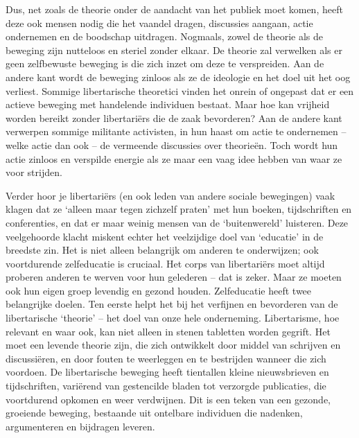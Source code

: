 \documentclass[
  a5paper,
  smalldemyvopaper,10pt,twoside,onecolumn,openright,extrafontsizes,hidelinks]{memoir}
\begin{document}
Dus, net zoals de theorie onder de aandacht van het publiek moet komen,
heeft deze ook mensen nodig die het vaandel dragen, discussies aangaan,
actie ondernemen en de boodschap uitdragen. Nogmaals, zowel de theorie
als de beweging zijn nutteloos en steriel zonder elkaar. De theorie zal
verwelken als er geen zelfbewuste beweging is die zich inzet om deze te
verspreiden. Aan de andere kant wordt de beweging zinloos als ze de
ideologie en het doel uit het oog verliest. Sommige libertarische
theoretici vinden het onrein of ongepast dat er een actieve beweging met
handelende individuen bestaat. Maar hoe kan vrijheid worden bereikt
zonder libertariërs die de zaak bevorderen? Aan de andere kant verwerpen
sommige militante activisten, in hun haast om actie te ondernemen --
welke actie dan ook -- de vermeende discussies over theorieën. Toch
wordt hun actie zinloos en verspilde energie als ze maar een vaag idee
hebben van waar ze voor strijden.

Verder hoor je libertariërs (en ook leden van andere sociale bewegingen)
vaak klagen dat ze `alleen maar tegen zichzelf praten' met hun boeken,
tijdschriften en conferenties, en dat er maar weinig mensen van de
`buitenwereld' luisteren. Deze veelgehoorde klacht miskent echter het
veelzijdige doel van `educatie' in de breedste zin. Het is niet alleen
belangrijk om anderen te onderwijzen; ook voortdurende zelfeducatie is
cruciaal. Het corps van libertariërs moet altijd proberen anderen te
werven voor hun gelederen -- dat is zeker. Maar ze moeten ook hun eigen
groep levendig en gezond houden. Zelfeducatie heeft twee belangrijke
doelen. Ten eerste helpt het bij het verfijnen en bevorderen van de
libertarische `theorie' -- het doel van onze hele onderneming.
Libertarisme, hoe relevant en waar ook, kan niet alleen in stenen
tabletten worden gegrift. Het moet een levende theorie zijn, die zich
ontwikkelt door middel van schrijven en discussiëren, en door fouten te
weerleggen en te bestrijden wanneer die zich voordoen. De libertarische
beweging heeft tientallen kleine nieuwsbrieven en tijdschriften,
variërend van gestencilde bladen tot verzorgde publicaties, die
voortdurend opkomen en weer verdwijnen. Dit is een teken van een
gezonde, groeiende beweging, bestaande uit ontelbare individuen die
nadenken, argumenteren en bijdragen leveren.
\end{document}
